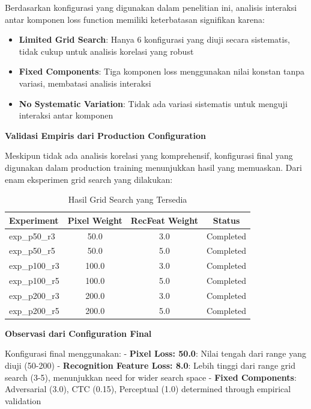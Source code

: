 \documentclass[12pt,a4paper]{article}
\begin{document}
Berdasarkan konfigurasi yang digunakan dalam penelitian ini, analisis interaksi antar komponen loss function memiliki keterbatasan signifikan karena:

\begin{itemize}[leftmargin=*]
    \item \textbf{Limited Grid Search}: Hanya 6 konfigurasi yang diuji secara sistematis, tidak cukup untuk analisis korelasi yang robust
    \item \textbf{Fixed Components}: Tiga komponen loss menggunakan nilai konstan tanpa variasi, membatasi analisis interaksi
    \item \textbf{No Systematic Variation}: Tidak ada variasi sistematis untuk menguji interaksi antar komponen
\end{itemize}

\textbf{Validasi Empiris dari Production Configuration}

Meskipun tidak ada analisis korelasi yang komprehensif, konfigurasi final yang digunakan dalam production training menunjukkan hasil yang memuaskan. Dari enam eksperimen grid search yang dilakukan:

\begin{table}[H]
\centering
\caption{Hasil Grid Search yang Tersedia}
\label{tab:grid-search-results}
\begin{tabular}{l|c|c|c}
\hline
\textbf{Experiment} & \textbf{Pixel Weight} & \textbf{RecFeat Weight} & \textbf{Status} \\
\hline
exp\_p50\_r3 & 50.0 & 3.0 & Completed \\
exp\_p50\_r5 & 50.0 & 5.0 & Completed \\
exp\_p100\_r3 & 100.0 & 3.0 & Completed \\
exp\_p100\_r5 & 100.0 & 5.0 & Completed \\
exp\_p200\_r3 & 200.0 & 3.0 & Completed \\
exp\_p200\_r5 & 200.0 & 5.0 & Completed \\
\hline
\end{tabular}
\end{table}

\textbf{Observasi dari Configuration Final}

Konfigurasi final menggunakan:
- \textbf{Pixel Loss: 50.0}: Nilai tengah dari range yang diuji (50-200)
- \textbf{Recognition Feature Loss: 8.0}: Lebih tinggi dari range grid search (3-5), menunjukkan need for wider search space
- \textbf{Fixed Components}: Adversarial (3.0), CTC (0.15), Perceptual (1.0) determined through empirical validation
\end{document}
